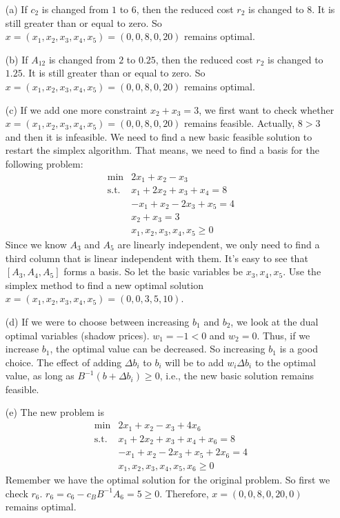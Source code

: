 \documentclass[12pt]{article}
\begin{document}
\begin{itemize}
  \item[(a)] If $c_2$ is changed from $1$ to $6$, then the reduced cost $r_2$ is changed to $8$. It is still greater than or equal to zero. So $x=(x_1,x_2,x_3,x_4,x_5)=(0,0,8,0,20)$ remains optimal.
  \item[(b)] If $A_{12}$ is changed from $2$ to $0.25$, then the reduced cost $r_2$ is changed to $1.25$. It is still greater than or equal to zero. So $x=(x_1,x_2,x_3,x_4,x_5)=(0,0,8,0,20)$ remains optimal.
  \item[(c)] If we add one more constraint $x_2+x_3=3$, we first want to check whether $x=(x_1,x_2,x_3,x_4,x_5)=(0,0,8,0,20)$ remains feasible. Actually, $8>3$ and then it is infeasible. We need to find a new basic feasible solution to restart the simplex algorithm. That means, we need to find a basis for the following problem:
      \begin{equation*}
  \begin{array}{rl}
    \min & 2x_1+x_2-x_3 \\
    \text{s.t.} & x_1+2x_2+x_3 + x_4 = 8 \\
    & -x_1 + x_2 - 2x_3 + x_5 = 4 \\
    & x_2 + x_3 = 3 \\
    & x_1,x_2,x_3,x_4,x_5 \geq 0
  \end{array}
  \end{equation*}
  Since we know $A_3$ and $A_5$ are linearly independent, we only need to find a third column that is linear independent with them. It's easy to see that $[A_3,A_4,A_5]$ forms a basis. So let the basic variables be $x_3,x_4,x_5$. Use the simplex method to find a new optimal solution $x=(x_1,x_2,x_3,x_4,x_5)=(0,0,3,5,10)$.
  \item[(d)] If we were to choose between increasing $b_1$ and $b_2$, we look at the dual optimal variables (shadow prices). $w_1=-1<0$ and $w_2=0$. Thus, if we increase $b_1$, the optimal value can be decreased. So increasing $b_1$ is a good choice. The effect of adding $\Delta b_i$ to $b_i$ will be to add $w_i\Delta b_i$ to the optimal value, as long as $B^{-1}(b+\Delta b_i)\geq 0$, i.e., the new basic solution remains feasible.
  \item[(e)] The new problem is
  \begin{equation*}
  \begin{array}{rl}
    \min & 2x_1+x_2-x_3+4x_6 \\
    \text{s.t.} & x_1+2x_2+x_3 + x_4 +x_6 = 8 \\
    & -x_1 + x_2 - 2x_3 + x_5 +2x_6= 4 \\
    & x_1,x_2,x_3,x_4,x_5,x_6 \geq 0
  \end{array}
  \end{equation*}
  Remember we have the optimal solution for the original problem. So first we check $r_6$. $r_6=c_6-c_BB^{-1}A_6=5\geq 0$. Therefore, $x=(0,0,8,0,20,0)$ remains optimal.
\end{itemize}
\end{document}
